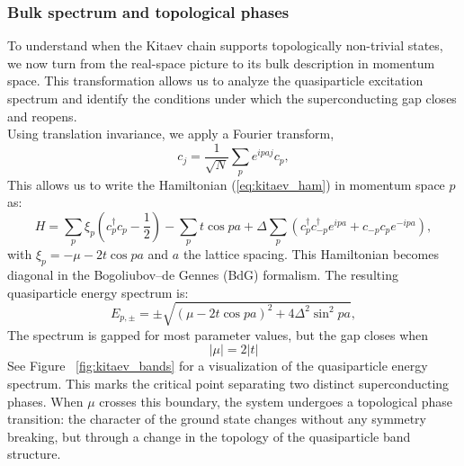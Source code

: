 \documentclass[11pt, letterpaper, titlepage]{article}
\begin{document}
\subsubsection{Bulk spectrum and topological phases}
To understand when the Kitaev chain supports topologically non-trivial states, we now turn from the real-space picture to its bulk description in momentum space. This transformation allows us to analyze the quasiparticle excitation spectrum and identify the conditions under which the superconducting gap closes and reopens.\\
Using translation invariance, we apply a Fourier transform,
$$
c_j = \frac{1}{\sqrt{N}} \sum_p e^{ipaj} c_p,
$$
This allows us to write the Hamiltonian (\ref{eq:kitaev_ham}) in momentum space $p$ as:
\begin{equation}
H = ∑_{ p}^{} ξ_p\left(c_p^{†} c_p - \frac{1}{2}\right) - ∑_{p}^{} t \cos p a + Δ ∑_{p}^{}\left(c_p^{†} c_{-p}^{†} e^{ipa} + c_{-p} c_p e^{-ipa}\right), 
\end{equation}
with $ξ_p = -μ - 2t \cos pa$ and $a$ the lattice spacing. This Hamiltonian becomes diagonal in the Bogoliubov–de Gennes (BdG) formalism. The resulting quasiparticle energy spectrum is:
\begin{equation}
  E_{p,\pm} = \pm \sqrt{(μ - 2t \cos{pa})^2 + 4Δ^2 \sin^2{pa}},
\end{equation}
The spectrum is gapped for most parameter values, but the gap closes when
$$
|μ| = 2|t|
$$
See Figure ~\ref{fig:kitaev_bands} for a visualization of the quasiparticle energy spectrum. This marks the critical point separating two distinct superconducting phases. When $μ$ crosses this boundary, the system undergoes a topological phase transition: the character of the ground state changes without any symmetry breaking, but through a change in the topology of the quasiparticle band structure.\\
\end{document}
